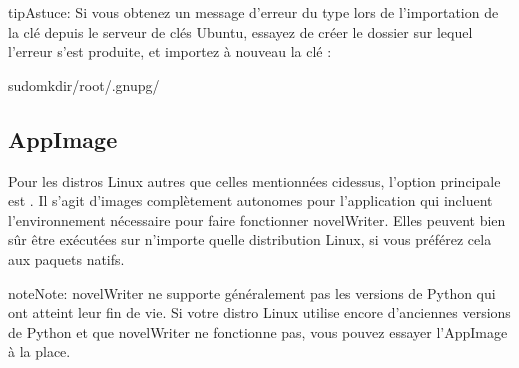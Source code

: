 \documentclass[a4paper,11pt,french]{sphinxmanual}
\begin{document}
\begin{sphinxadmonition}{tip}{Astuce:}
\sphinxAtStartPar
Si vous obtenez un message d’erreur du type  lors de l’importation de la clé depuis le serveur de clés Ubuntu, essayez de créer le dossier sur lequel l’erreur s’est produite, et importez à nouveau la clé :

\begin{sphinxVerbatim}[commandchars=\\\{\}]
sudomkdir/root/.gnupg/
\end{sphinxVerbatim}
\end{sphinxadmonition}


\subsection{AppImage}
\label{\detokenize{int_started:appimage-releases}}
\sphinxAtStartPar
Pour les distros Linux autres que celles mentionnées ci\sphinxhyphen{}dessus, l’option principale est . Il s’agit d’images complètement autonomes pour l’application qui incluent l’environnement nécessaire pour faire fonctionner novelWriter. Elles peuvent bien sûr être exécutées sur n’importe quelle distribution Linux, si vous préférez cela aux paquets natifs.

\begin{sphinxadmonition}{note}{Note:}
\sphinxAtStartPar
novelWriter ne supporte généralement pas les versions de Python qui ont atteint leur fin de vie. Si votre distro Linux utilise encore d’anciennes versions de Python et que novelWriter ne fonctionne pas, vous pouvez essayer l’AppImage à la place.
\end{sphinxadmonition}
\end{document}
